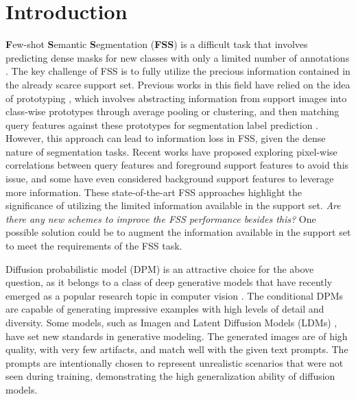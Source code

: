 \documentclass[sigconf]{acmart}
\begin{document}




\maketitle

\section{Introduction}

\textbf{F}ew-shot \textbf{S}emantic \textbf{S}egmentation (\textbf{FSS}) is a difficult task that involves predicting dense masks for new classes with only a limited number of annotations \cite{pl,crnet,fwbnet,pgnet,fss1000}. The key challenge of FSS is to fully utilize the precious information contained in the already scarce support set. Previous works in this field have relied on the idea of prototyping \cite{prototype}, which involves abstracting information from support images into class-wise prototypes through average pooling or clustering, and then matching query features against these prototypes for segmentation label prediction \cite{sgone,fwbnet}. However, this approach can lead to information loss in FSS, given the dense nature of segmentation tasks. Recent works have proposed exploring pixel-wise correlations between query features and foreground support features to avoid this issue, and some have even considered background support features to leverage more information. These state-of-the-art FSS approaches \cite{canet,BAM2022,DCAMA2022,HDMNet2023,HSNet2021} highlight the significance of utilizing the limited information available in the support set. \textit{Are there any new schemes to improve the FSS performance besides this?} One possible solution could be to augment the information available in the support set to meet the requirements of the FSS task.

Diffusion probabilistic model (DPM) is an attractive choice for the above question, as it belongs to a class of deep generative models that have recently emerged as a popular research topic in computer vision \cite{song2020score,song2019generative,ho2020denoising,rombach2022high,saharia2022photorealistic}. The conditional DPMs are capable of generating impressive examples with high levels of detail and diversity. Some models, such as Imagen \cite{saharia2022photorealistic} and Latent Diffusion Models (LDMs) \cite{rombach2022high}, have set new standards in generative modeling. The generated images are of high quality, with very few artifacts, and match well with the given text prompts. The prompts are intentionally chosen to represent unrealistic scenarios that were not seen during training, demonstrating the high generalization ability of diffusion models.
\end{document}
